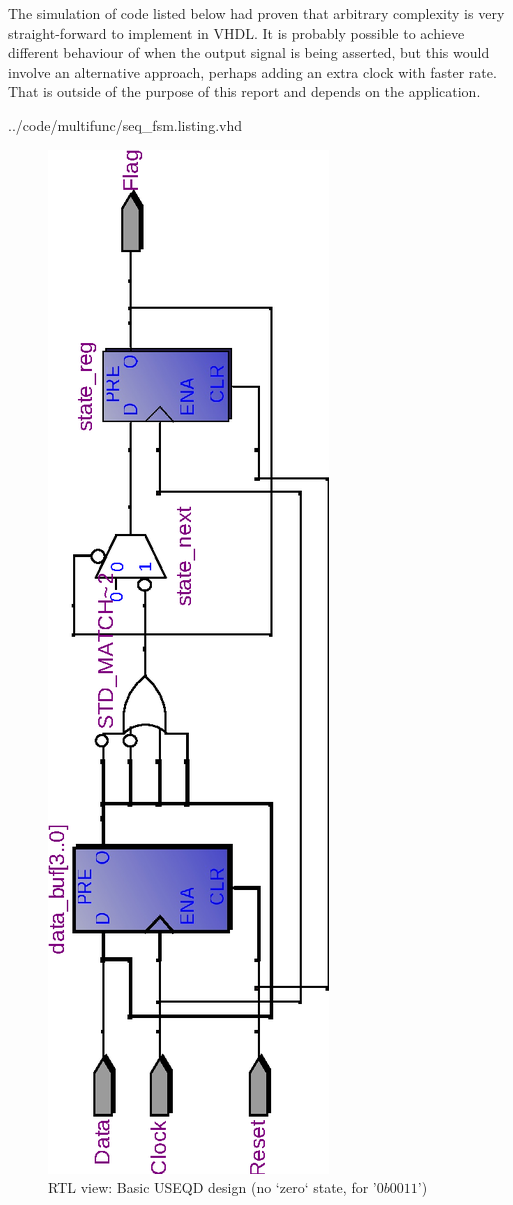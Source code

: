 \documentclass[10pt,a4paper]{report}
\begin{document}
 The simulation of code listed below had
 proven that arbitrary complexity is very
 straight-forward to implement in VHDL.
 It is probably possible to achieve
 different behaviour of when the output
 signal is being asserted, but this would
 involve an alternative approach, perhaps
 adding an extra clock with faster rate.
 That is outside of the purpose of this
 report and depends on the application.


\pagebreak

{../code/multifunc/seq_fsm.listing.vhd}

\begin{figure} \center

\includegraphics[scale=0.8,angle=-90]{graphs/seq_test1.rtl_BASIC4.eps}
\caption{\small{RTL view: Basic USEQD design (no `zero` state, for '$0b0011$')}} \label{rtl:usd:1b}


\end{figure}
\end{document}
